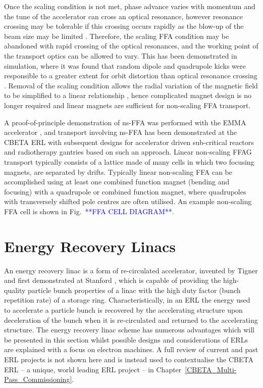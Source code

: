 \documentclass[../main.tex]{subfiles}
\begin{document}
Once the scaling condition is not met, phase advance varies with momentum and the tune of the accelerator can cross an optical resonance, however resonance crossing may be tolerable if this crossing occurs rapidly as the blow-up of the beam size may be limited \cite{mills1997nsffa,johnstone1997nsffa}. Therefore, the scaling FFA condition may be abandoned with rapid crossing of the optical resonances, and the working point of the transport optics can be allowed to vary. This has been demonstrated in simulation, where it was found that random dipole and quadrupole kicks were responsible to a greater extent for orbit distortion than optical resonance crossing \cite{machida2007orbit}. Removal of the scaling condition allows the radial variation of the magnetic field to be simplified to a linear relationship \cite{johnstone1999fixed}, hence complicated magnet design is no longer required and linear magnets are sufficient for non-scaling FFA transport.

A proof-of-principle demonstration of ns-FFA was performed with the EMMA accelerator \cite{barlow2010emma,machida2012acceleration}, and transport involving ns-FFA has been demonstrated at the CBETA ERL \cite{hoffstaetter2017cbeta,bartnik2020cbeta} with subsequent designs for accelerator driven sub-critical reactors \cite{tygier2011high} and radiotherapy gantries \cite{trbojevic2009ffags,} based on such an approach. Linear non-scaling FFAG transport typically consists of a lattice made of many cells in which two focusing magnets, are separated by drifts. Typically linear non-scaling FFA can be accomplished using at least one combined function magnet (bending and focusing) with a quadrupole or combined function magnet, where quadrupoles with transversely shifted pole centres are often utilised. An example non-scaling FFA cell is shown in Fig.~\textcolor{blue}{**FFA CELL DIAGRAM**}.

\section{Energy Recovery Linacs}

An energy recovery linac is a form of re-circulated accelerator, invented by Tigner \cite{tigner1965possible} and first demonstrated at Stanford \cite{smith1987development}, which is capable of providing the high-quality particle bunch properties of a linac with the high duty factor (bunch repetition rate) of a storage ring. Characteristically, in an ERL the energy used to accelerate a particle bunch is recovered by the accelerating structure upon deceleration of the bunch when it is re-circulated and returned to the accelerating structure. The energy recovery linac scheme has numerous advantages which will be presented in this section whilst possible designs and considerations of ERLs are explained with a focus on electron machines. A full review of current and past ERL projects is not shown here and is instead used to contextualise the CBETA ERL -- a unique, world leading ERL project -- in Chapter~\ref{CBETA_Multi-Pass_Commissioning}. 
\end{document}
